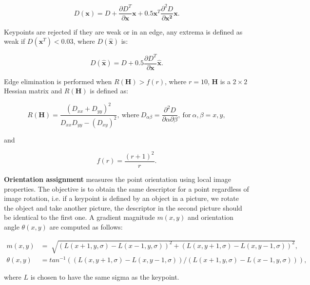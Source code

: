 \documentclass[12pt]{article}
\begin{document}
\begin{equation}
D(\mathbf{x}) = D + \frac{ \partial D^T}{\partial \mathbf{x}} \mathbf{x} + 0.5 \mathbf{x}^T \frac{\partial^2 D}{\partial \mathbf{x^2}}\mathbf{x}.
\end{equation}

Keypoints are rejected if they are weak or in an edge, any extrema is defined as weak if $D(\mathbf{x}^T) < 0.03$, where $D(\mathbf{\hat{x}})$ is:

\begin{equation}
D(\mathbf{\hat{x}}) = D + 0.5 \frac{\partial D^T}{\partial \mathbf{x}}\mathbf{\hat{x}}.
\end{equation}

Edge elimination is performed when $R(\mathbf{H}) > f(r)$, where $r = 10$, $\mathbf{H}$ is a $2 \times 2$ Hessian matrix and $R(\mathbf{H})$ is defined as:

\begin{equation}
R(\mathbf{H})= \frac{ (D_{xx} + D_{yy})^2 }{ D_{xx} D_{yy} - (D_{xy})^2}, \: \text{where} \: D_{\alpha \beta} = \frac{\partial^2 D}{\partial \alpha \partial \beta}, \:  \text{for} \: \alpha, \beta = x, y,
\end{equation}

and 

\begin{equation}
f(r) = \frac{(r + 1)^2}{r}.
\end{equation}

\textbf{Orientation assignment} measures the point orientation using local image properties.
The objective is to obtain the same descriptor for a point regardless of image rotation, i.e. if a keypoint is defined by an object in a picture, we rotate the object and take another picture, the descriptor in the second picture should be identical to the first one.
A gradient magnitude $m(x,y)$ and orientation angle $\theta(x,y)$ are computed as follows:

\begin{equation}
\begin{aligned}
	m(x,y) &= \sqrt[]{(L(x+1,y,\sigma) - L(x-1,y,\sigma))^2 + (L(x,y+1,\sigma) - L(x,y-1,\sigma))^2}, \\
	\theta(x,y) &= tan^{-1} \left( \left( L(x,y+1,\sigma) - L(x, y-1, \sigma) \right) / \left( L(x+1,y,\sigma) - L(x-1, y, \sigma) \right) \right),
\end{aligned} \label{eq:conv}
\end{equation}

where $L$ is chosen to have the same sigma as the keypoint.
\end{document}

